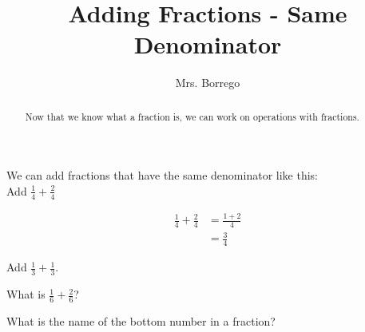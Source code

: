 \documentclass{ximera}
\title{Adding Fractions - Same Denominator}
\author{Mrs. Borrego}
\begin{document}
\begin{abstract}
    Now that we know what a fraction is, we can work on operations with fractions.
\end{abstract}
\maketitle

\begin{example} We can add fractions that have the same denominator like this: \\
Add $\frac{1}{4}+\frac{2}{4}$
\begin{explanation}
\begin{align*}
    \frac{1}{4}+\frac{2}{4}&=\frac{1+2}{4}\\
    &= \frac{3}{4}
\end{align*}
\end{explanation}
\end{example}


\begin{problem}
Add $\frac{1}{3}+\frac{1}{3}$.
\begin{multipleChoice}
\end{multipleChoice}
\end{problem}

\begin{problem} What is $\frac{1}{6}+\frac{2}{6}$?
\begin{selectAll}
\end{selectAll}
\end{problem}

\begin{question}What is the name of the bottom number in a fraction?
\begin{multipleChoice}
\end{multipleChoice}
\end{question}
\end{document}
